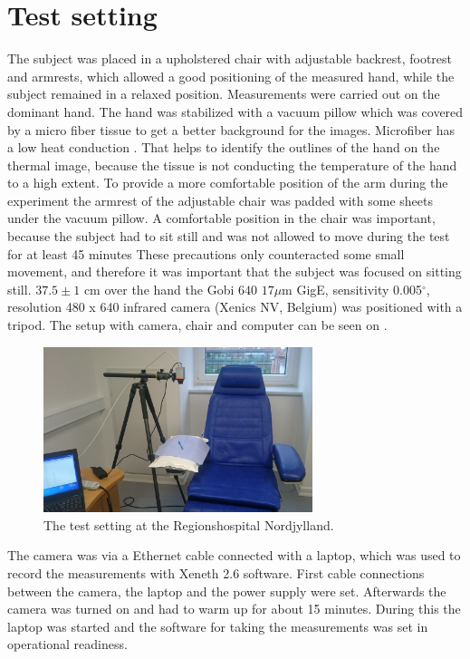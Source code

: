\section{Test setting}

The subject was placed in a upholstered chair with adjustable backrest, footrest and armrests, which allowed a good positioning of the measured hand, while the subject remained in a relaxed position. Measurements were carried out on the dominant hand. The hand was stabilized with a vacuum pillow which was covered by a micro fiber tissue to get a better background for the images. Microfiber has a low heat conduction \cite{schacher2000}. That helps to identify the outlines of the hand on the thermal image, because the tissue is not conducting the temperature of the hand to a high extent. To provide a more comfortable position of the arm during the experiment the armrest of the adjustable chair was padded with some sheets under the vacuum pillow. A comfortable position in the chair was important, because the subject had to sit still and was not allowed to move during the test for at least 45 minutes These precautions only counteracted some small movement, and therefore it was important that the subject was focused on sitting still. 
$37.5\pm 1$ cm over the hand the Gobi $640$ $17\mu$m GigE, sensitivity 0.005$^\circ$, resolution 480 x 640 infrared camera (Xenics NV, Belgium) was positioned with a tripod. The setup with camera, chair and computer can be seen on . 


\begin{figure}[H]
	\includegraphics[width=0.7\textwidth]{figures/setting}
	\caption{The test setting at the Regionshospital Nordjylland.}
	\label{fig:setting}
\end{figure}

The camera was via a Ethernet cable connected with a laptop, which was used to record the measurements with Xeneth 2.6 software. 
First cable connections between the camera, the laptop and the power supply were set. Afterwards the camera was turned on and had to warm up for about 15 minutes. During this the laptop was started and the software for taking the measurements was set in operational readiness.

